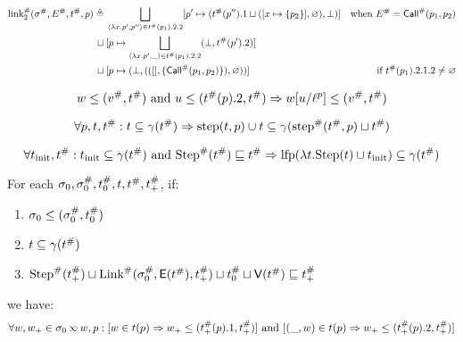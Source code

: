 \documentclass{article}
\begin{document}
\begin{align*}
	{\text{link}}^{\#}_2({\sigma}^{\#},{E}^{\#},{t}^{\#},p) \triangleq & \: \bigsqcup_{\langle\lambda x.p',p''\rangle\in{t}^{\#}(p_1).2.2}[p'\mapsto({t}^{\#}(p'').1\sqcup([x\mapsto\{p_2\}],\varnothing),\bot)] & \text{when }{E}^{\#}={\textsf{Call}}^{\#}(p_1,p_2)     \\
	\sqcup                                                   & \: [p\mapsto\bigsqcup_{\langle\lambda x.p',\_\rangle\in{t}^{\#}(p_1).2.2}(\bot,{t}^{\#}(p').2)]                                                                                          \\
	\sqcup                                                   & \: [p\mapsto(\bot,(([],\{{\textsf{Call}}^{\#}(p_1,p_2)\}),\varnothing))]                                                                              & \text{if }{t}^{\#}(p_1).2.1.2\neq\varnothing
\end{align*}
\begin{lem}
  \[w\le({v}^{\#},{t}^{\#})\text{ and }u\le({t}^{\#}(p).2,{t}^{\#})\Rightarrow w[u/{\ell}^{p}]\le({v}^{\#},{t}^{\#})\]
\end{lem}
\begin{lem}
  \[\forall p,t,{t}^{\#}:t\subseteq\gamma({t}^{\#})\Rightarrow\text{step}(t,p)\cup t\subseteq\gamma({\text{step}}^{\#}({t}^{\#},p)\sqcup{t}^{\#})\]
\end{lem}
\begin{lem}
  \[\forall t_{\text{init}},{t}^{\#}:t_{\text{init}}\subseteq\gamma({t}^{\#})\text{ and }{\text{Step}}^{\#}({t}^{\#})\sqsubseteq{t}^{\#}\Rightarrow\text{lfp}(\lambda t.\text{Step}(t)\cup t_{\text{init}})\subseteq\gamma({t}^{\#})\]
\end{lem}
\begin{lem}
  For each $\sigma_0,{\sigma}^{\#}_0,{t}^{\#}_0,t,{t}^{\#},{t}^{\#}_+$, if:

  \begin{enumerate}
    \item$\sigma_0\le({\sigma}^{\#}_0,{t}^{\#}_0)$
    \item$t\subseteq\gamma({t}^{\#})$
    \item${\text{Step}}^{\#}({t}^{\#}_+)\sqcup{\text{Link}}^{\#}({\sigma}^{\#}_0,\mathsf{E}({t}^{\#}),{t}^{\#}_+)\sqcup{t}^{\#}_0\sqcup\mathsf{V}({t}^{\#})\sqsubseteq{t}^{\#}_+$
  \end{enumerate}
  we have:
  \[\forall w,w_+\in\ctx_0\semlink w,p:[w\in\ptree(p)\Rightarrow w_+\le(\Abs\ptree_+(p).1,\Abs\ptree_+)]\text{ and }[(\_,w)\in\ptree(p)\Rightarrow w_+\le(\Abs\ptree_+(p).2,\Abs\ptree_+)]\]
\end{lem}
\end{document}
